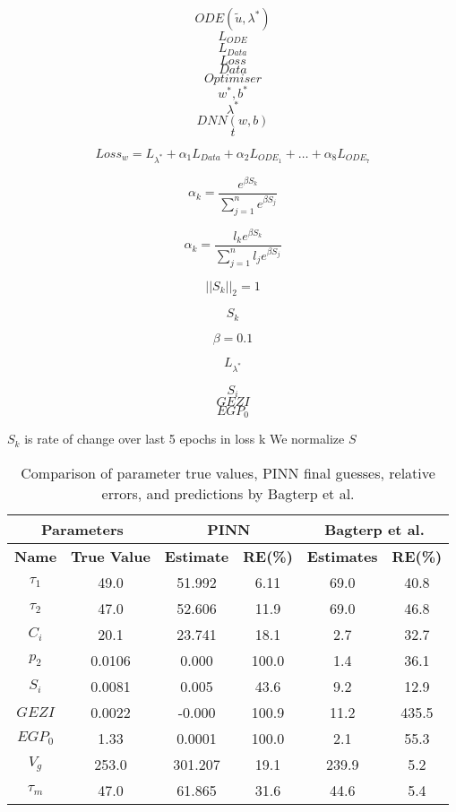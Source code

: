 \documentclass[11pt]{memoir}
\begin{document}
	$$ODE\left(\tilde{u}, \lambda^*\right) $$
	\[ L_{ODE} \]
	\[ L_{Data} \]
	\[ Loss \]
	\[ Data \]
	\[ Optimiser \]
	\[ w^*, b^* \]
	\[ \lambda^* \]
	\[ DNN(w,b) \]
	\[ t \]
	
	 \[Loss_{w} = L_{\lambda^*} + \alpha_1 L_{Data} + \alpha_{2}L_{ODE_1} + \dots + \alpha_8L_{ODE_7} \]
	 
	 \[\alpha_k = \frac{e^{\beta S_k}}{\sum_{j=1}^n e ^{\beta S_j} }\]
	 
	 \[\alpha_k = \frac{l_k e^{\beta S_k}}{\sum_{j=1}^n l_j e ^{\beta S_j} }\]
	 
	 \[ \left|\left|S_k\right|\right|_2 = 1 \]
	 
	 \[ S_k \]
	 
	 \[ \beta = 0.1 \]
	 
	 \[ L_{\lambda^*} \]
	 
	 \[ S_i \]
	 \[ GEZI \]
	 \[ EGP_0 \]
	 
	 $S_k$ is rate of change over last 5 epochs in loss k
	 We normalize $S$
	 
	 
	 \begin{table}[h!]
	 	\centering
	 	\begin{tabular}{|c|c|c|c|c|c|}
	 		\hline
	 		\multicolumn{2}{|c|}{\textbf{Parameters}} & \multicolumn{2}{c|}{\textbf{PINN}} & \multicolumn{2}{c|}{\textbf{Bagterp et al.}} \\ \hline
	 		\textbf{Name} & \textbf{True Value} & \textbf{Estimate} & \textbf{RE(\%)} & \textbf{Estimates} & \textbf{RE(\%)} \\ \hline
	 		$\tau_1$    &  49.0  &  51.992  &  6.11   & 69.0     & 40.8     \\ \hline
	 		$\tau_2$    &  47.0  &  52.606  &  11.9   & 69.0     & 46.8     \\ \hline
	 		$C_i$   	&  20.1  &  23.741  &   18.1  & 2.7      & 32.7     \\ \hline
	 		$p_2$      &  0.0106   &  0.000   &  100.0   & 1.4      & 36.1     \\ \hline
	 		$S_i$      &  0.0081   &  0.005   &  43.6   & 9.2      & 12.9     \\ \hline
	 		$GEZI$    & 0.0022    & -0.000   & 100.9    & 11.2     &  435.5   \\ \hline
	 		$EGP_0$    & 1.33    & 0.0001    & 100.0    & 2.1      & 55.3     \\ \hline
	 		$V_g$      & 253.0  & 301.207  & 19.1    & 239.9    & 5.2      \\ \hline
	 		$\tau_m$    & 47.0   & 61.865   & 31.6    & 44.6     & 5.4      \\ \hline
	 	\end{tabular}
	 	\caption{Comparison of parameter true values, PINN final guesses, relative errors, and predictions by Bagterp et al.}
	 	\label{tab:parameter_comparison}
	 \end{table}
	 
\end{document}

